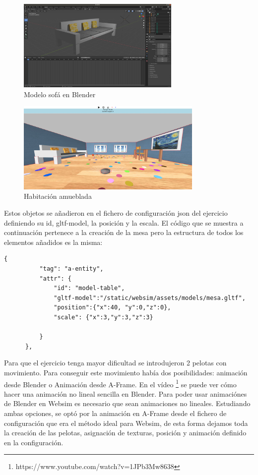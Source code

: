 \begin{figure}[H]
  \centering
 \includegraphics[width=0.7\textwidth]{chapters/images/sofa.png}
  \caption{Modelo sofá en Blender}
\end{figure}

\begin{figure}[H]
\centering
\includegraphics[width=0.8\textwidth, height=0.4\textwidth]{chapters/images/habitacioncon.png}
\caption{Habitación amueblada}
\end{figure}

Estos objetos se añadieron en el fichero de configuración json del ejercicio definiendo su id, gltf-model, la posición y la escala. El código que se muestra a continuación pertenece a la creación de la mesa pero  la estructura  de todos los elementos añadidos es la misma: 
\begin{lstlisting}
{
          "tag": "a-entity",
          "attr": {
              "id": "model-table",
              "gltf-model":"/static/websim/assets/models/mesa.gltf",
              "position":{"x":40, "y":0,"z":0},
              "scale": {"x":3,"y":3,"z":3}

          }
      },
\end{lstlisting}

Para que el ejercicio tenga mayor dificultad se introdujeron 2 pelotas con movimiento. Para conseguir este movimiento había dos posibilidades: animación desde Blender o Animación desde A-Frame. 
En el vídeo \footnote{https://www.youtube.com/watch?v=1JPb3Mw8638}  se puede ver cómo hacer una animación no lineal sencilla en Blender. Para poder usar animaciónes de Blender en Websim es necesario que sean animaciones no lineales. Estudiando ambas opciones, se optó por la animación en A-Frame desde el fichero de configuración que era el método ideal para Websim, de esta forma dejamos toda la creación de las pelotas, asignación de texturas, posición y  animación definido en la configuración.

